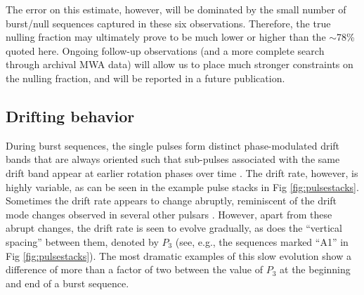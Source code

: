 \documentclass[linenumbers]{aastex631}
\newcommand{\nullfraction}{78\%}
\begin{document}
The error on this estimate, however, will be dominated by the small number of burst/null sequences captured in these six observations.
Therefore, the true nulling fraction may ultimately prove to be much lower or higher than the $\sim$\nullfraction{} quoted here.
Ongoing follow-up observations (and a more complete search through archival MWA data) will allow us to place much stronger constraints on the nulling fraction, and will be reported in a future publication.

\subsection{Drifting behavior}
\label{sec:drifting_analysis}

During burst sequences, the single pulses form distinct phase-modulated drift bands that are always oriented such that sub-pulses associated with the same drift band appear at earlier rotation phases over time \citep[`positive drifting' in the classification scheme of][]{Basu2019a}.
The drift rate, however, is highly variable, as can be seen in the example pulse stacks in Fig \ref{fig:pulsestacks}.
Sometimes the drift rate appears to change abruptly, reminiscent of the drift mode changes observed in several other pulsars \citep[e.g.][]{Kloumann2010,Rankin2013,Joshi2017,McSweeney2019a}.
However, apart from these abrupt changes, the drift rate is seen to evolve gradually, as does the ``vertical spacing'' between them, denoted by $P_3$ (see, e.g., the sequences marked ``A1'' in Fig \ref{fig:pulsestacks}).
The most dramatic examples of this slow evolution show a difference of more than a factor of two between the value of $P_3$ at the beginning and end of a burst sequence.
\end{document}
